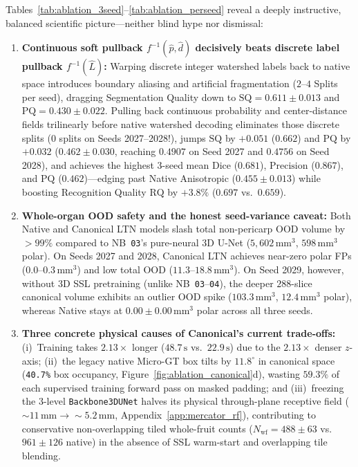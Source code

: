 \documentclass[10pt,a4paper]{article}
\renewcommand{\_}{\origunderscore\allowbreak}
\begin{document}
Tables~\ref{tab:ablation_3seed}--\ref{tab:ablation_perseed} reveal a deeply instructive, balanced scientific picture---neither blind hype nor dismissal:
\begin{enumerate}
    \item \textbf{Continuous soft pullback $f^{-1}(\hat{p},\hat{d})$ decisively beats discrete label pullback $f^{-1}(\hat{L})$:} Warping discrete integer watershed labels back to native space introduces boundary aliasing and artificial fragmentation ($2\text{--}4$ Splits per seed), dragging Segmentation Quality down to $\text{SQ} = 0.611 \pm 0.013$ and $\text{PQ} = 0.430 \pm 0.022$. Pulling back continuous probability and center-distance fields trilinearly before native watershed decoding eliminates those discrete splits ($0$ splits on Seeds 2027--2028!), jumps $\text{SQ}$ by $+0.051$ ($0.662$) and $\text{PQ}$ by $+0.032$ ($\mathbf{0.462 \pm 0.030}$, reaching $\mathbf{0.4907}$ on Seed 2027 and $\mathbf{0.4756}$ on Seed 2028), and achieves the highest 3-seed mean $\text{Dice}$ ($0.681$), $\text{Precision}$ ($0.867$), and $\text{PQ}$ ($0.462$)---edging past Native Anisotropic ($0.455 \pm 0.013$) while boosting Recognition Quality $\text{RQ}$ by $+3.8\%$ ($0.697$ vs.\ $0.659$).
    \item \textbf{Whole-organ OOD safety and the honest seed-variance caveat:} Both Native and Canonical LTN models slash total non-pericarp OOD volume by $>99\%$ compared to NB~\texttt{03}'s pure-neural 3D U-Net ($5{,}602\,\text{mm}^3$, $598\,\text{mm}^3$ polar). On Seeds 2027 and 2028, Canonical LTN achieves near-zero polar FPs ($0.0\text{--}0.3\,\text{mm}^3$) and low total OOD ($11.3\text{--}18.8\,\text{mm}^3$). On Seed 2029, however, without 3D SSL pretraining (unlike NB~\texttt{03}--\texttt{04}), the deeper $288$-slice canonical volume exhibits an outlier OOD spike ($103.3\,\text{mm}^3$, $12.4\,\text{mm}^3$ polar), whereas Native stays at $0.00 \pm 0.00\,\text{mm}^3$ polar across all three seeds.
    \item \textbf{Three concrete physical causes of Canonical's current trade-offs:} (i)~Training takes $2.13\times$ longer ($48.7\,\text{s}$ vs.\ $22.9\,\text{s}$) due to the $2.13\times$ denser $z$-axis; (ii)~the legacy native Micro-GT box tilts by $11.8^\circ$ in canonical space (\texttt{40.7\%} box occupancy, Figure~\ref{fig:ablation_canonical}d), wasting $59.3\%$ of each supervised training forward pass on masked padding; and (iii)~freezing the 3-level \texttt{Backbone3DUNet} halves its physical through-plane receptive field ($\sim 11\,\text{mm} \to \sim 5.2\,\text{mm}$, Appendix~\ref{app:mercator_rf}), contributing to conservative non-overlapping tiled whole-fruit counts ($N_{\text{wf}} = 488 \pm 63$ vs.\ $961 \pm 126$ native) in the absence of SSL warm-start and overlapping tile blending.
\end{enumerate}
\end{document}
